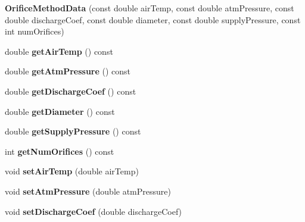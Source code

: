 \begin{DoxyCompactItemize}
{\bfseries Orifice\+Method\+Data} (const double air\+Temp, const double atm\+Pressure, const double discharge\+Coef, const double diameter, const double supply\+Pressure, const int num\+Orifices)
\item 
\mbox{\label{class_orifice_method_data_ad2264b0df969566c306ac99bb2de20f0}} 
double {\bfseries get\+Air\+Temp} () const
\item 
\mbox{\label{class_orifice_method_data_a71584cfb77a4f56503c58b77f131fea1}} 
double {\bfseries get\+Atm\+Pressure} () const
\item 
\mbox{\label{class_orifice_method_data_a3d55918aab47e9509924a1b5a24757b1}} 
double {\bfseries get\+Discharge\+Coef} () const
\item 
\mbox{\label{class_orifice_method_data_ac7fa3a032be60cfee2b549221bc3d42c}} 
double {\bfseries get\+Diameter} () const
\item 
\mbox{\label{class_orifice_method_data_ad62e13923b1fa76ecc52cba439e914af}} 
double {\bfseries get\+Supply\+Pressure} () const
\item 
\mbox{\label{class_orifice_method_data_a548e339ee8e96f23b6edf17438b0096b}} 
int {\bfseries get\+Num\+Orifices} () const
\item 
\mbox{\label{class_orifice_method_data_a4187943ff754f0418cd6b0e634c596d2}} 
void {\bfseries set\+Air\+Temp} (double air\+Temp)
\item 
\mbox{\label{class_orifice_method_data_af6cb7bc9e4576a69fc2e0d5134a15f15}} 
void {\bfseries set\+Atm\+Pressure} (double atm\+Pressure)
\item 
\mbox{\label{class_orifice_method_data_a7165032624c746feebcb1e7cafd90015}} 
void {\bfseries set\+Discharge\+Coef} (double discharge\+Coef)
\item 
\mbox{\label{class_orifice_method_data_a42f7848cba5bc63f76e1ef86b2c13eb5}} 

\end{DoxyCompactItemize}
